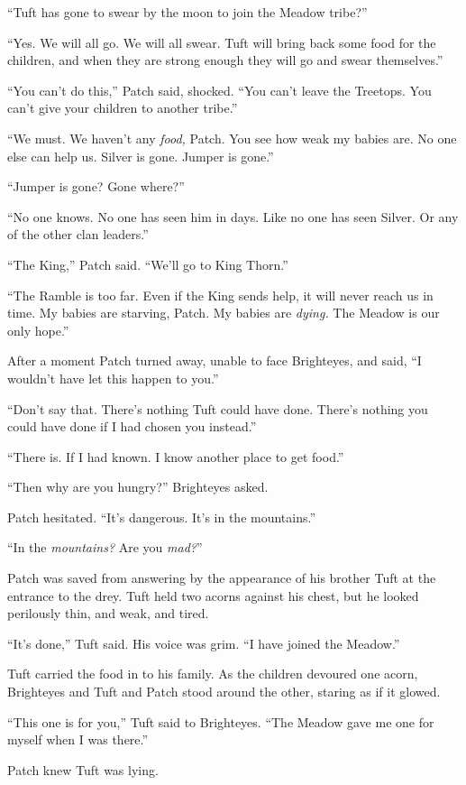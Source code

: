 \documentclass[12pt]{memoir}
\begin{document}
“Tuft has gone to swear by the moon to join the Meadow tribe?”

“Yes. We will all go. We will all swear. Tuft will bring back some
food for the children, and when they are strong enough they will go
and swear themselves.”

“You can’t do this,” Patch said, shocked. “You can’t leave the
Treetops. You can’t give your children to another tribe.”

“We must. We haven’t any \textit{food,} Patch. You see how weak my
babies are. No one else can help us. Silver is gone. Jumper is gone.”

“Jumper is gone? Gone where?”

“No one knows. No one has seen him in days. Like no one has seen
Silver. Or any of the other clan leaders.”

“The King,” Patch said. “We’ll go to King Thorn.”

“The Ramble is too far. Even if the King sends help, it will never
reach us in time. My babies are starving, Patch. My babies are
\textit{dying.} The Meadow is our only hope.”

After a moment Patch turned away, unable to face Brighteyes, and said,
“I wouldn’t have let this happen to you.”

“Don’t say that. There’s nothing Tuft could have done. There’s nothing
you could have done if I had chosen you instead.”

“There is. If I had known. I know another place to get food.”

“Then why are you hungry?” Brighteyes asked.

Patch hesitated. “It’s dangerous. It’s in the mountains.”

“In the \textit{mountains?} Are you \textit{mad?}”

Patch was saved from answering by the appearance of his brother Tuft
at the entrance to the drey. Tuft held two acorns against his chest,
but he looked perilously thin, and weak, and tired.

“It’s done,” Tuft said. His voice was grim. “I have joined the
Meadow.”

Tuft carried the food in to his family. As the children devoured one
acorn, Brighteyes and Tuft and Patch stood around the other, staring
as if it glowed.

“This one is for you,” Tuft said to Brighteyes. “The Meadow gave me
one for myself when I was there.”

Patch knew Tuft was lying.
\end{document}
